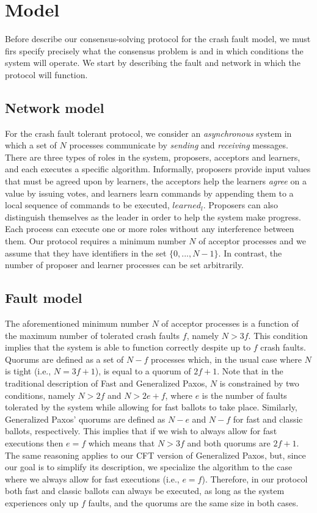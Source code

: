 \section{Model} \label{cft_model}

Before describe our consensus-solving protocol for the crash fault model, we must firs specify precisely what the consensus problem is and in which conditions the system will operate. We start by describing the fault and network in which the protocol will function.

\subsection{Network model}
For the crash fault tolerant protocol, we consider an \emph{asynchronous} system in which a set of $N$ processes communicate by \emph{sending} and \emph{receiving} messages. There are three types of roles in the system, proposers, acceptors and learners, and each executes a specific algorithm. Informally, proposers provide input values that must be agreed upon by learners, the acceptors help the learners \emph{agree} on a value by issuing votes, and learners learn commands by appending them to a local sequence of commands to be executed, $learned_l$. Proposers can also distinguish themselves as the leader in order to help the system make progress. Each process can execute one or more roles without any interference between them. Our protocol requires a minimum number $N$ of acceptor processes and we assume that they have identifiers in the set $\{0,...,N-1\}$. In contrast, the number of proposer and learner processes can be set arbitrarily.

\subsection{Fault model}
The aforementioned minimum number $N$ of acceptor processes is a function of the maximum number of tolerated crash faults $f$, namely $N > 3f$. This condition implies that the system is able to function correctly despite up to $f$ crash faults. Quorums are defined as a set of $N-f$ processes which, in the usual case where $N$ is tight (i.e., $N=3f+1$), is equal to a quorum of $2f+1$. Note that in the traditional description of Fast and Generalized Paxos, $N$ is constrained by two conditions, namely $N>2f$ and $N>2e+f$, where $e$ is the number of faults tolerated by the system while allowing for fast ballots to take place. Similarly, Generalized Paxos' quorums are defined as $N-e$ and $N-f$ for fast and classic ballots, respectively. This implies that if we wish to always allow for fast executions then $e=f$ which means that $N>3f$ and both quorums are $2f+1$. The same reasoning applies to our CFT version of Generalized Paxos, but, since our goal is to simplify its description, we specialize the algorithm to the case where we always allow for fast executions (i.e., $e=f$). Therefore, in our protocol both fast and classic ballots can always be executed, as long as the system experiences only up $f$ faults, and the quorums are the same size in both cases.

